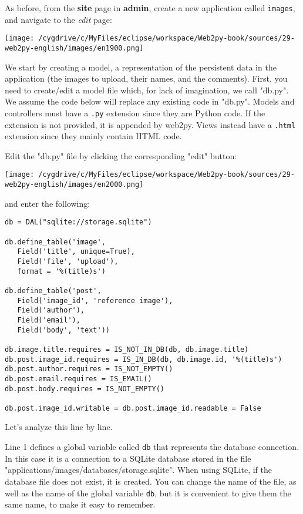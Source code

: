 \documentclass[justified,sixbynine,notoc]{tufte-book}
\def\ft{\small\tt}
\def\inxx#1{\index{#1}}
\begin{document}
\begin{fullwidth}
As before, from the {\bf site} page in {\bf admin}, create a new application called {\ft images}, and navigate to the {\it edit} page:


\goodbreak\begin{center}\texttt{[image: /cygdrive/c/MyFiles/eclipse/workspace/Web2py-book/sources/29-web2py-english/images/en1900.png]}\end{center}


We start by creating a model, a representation of the persistent data in the application (the images to upload, their names, and the comments). First, you need to create/edit a model file which, for lack of imagination, we call "db.py". We assume the code below will replace any existing code in "db.py". Models and controllers must have a {\ft .py} extension since they are Python code. If the extension is not provided, it is appended by web2py. Views instead have a {\ft .html} extension since they mainly contain HTML code.

Edit the "db.py" file by clicking the corresponding "edit" button:


\goodbreak\begin{center}\texttt{[image: /cygdrive/c/MyFiles/eclipse/workspace/Web2py-book/sources/29-web2py-english/images/en2000.png]}\end{center}

\noindent and enter the following:

\inxx{IS\_EMAIL} \inxx{IS\_NOT\_EMPTY} \inxx{IS\_IN\_DB}
\begin{lstlisting}
db = DAL("sqlite://storage.sqlite")

db.define_table('image',
   Field('title', unique=True),
   Field('file', 'upload'),
   format = '%(title)s')

db.define_table('post',
   Field('image_id', 'reference image'),
   Field('author'),
   Field('email'),
   Field('body', 'text'))

db.image.title.requires = IS_NOT_IN_DB(db, db.image.title)
db.post.image_id.requires = IS_IN_DB(db, db.image.id, '%(title)s')
db.post.author.requires = IS_NOT_EMPTY()
db.post.email.requires = IS_EMAIL()
db.post.body.requires = IS_NOT_EMPTY()

db.post.image_id.writable = db.post.image_id.readable = False
\end{lstlisting}

Let's analyze this line by line.

Line 1 defines a global variable called {\ft db} that represents the database connection. In this case it is a connection to a SQLite database stored in the file  "applications/images/databases/storage.sqlite". When using SQLite, if the database file does not exist, it is created. You can change the name of the file, as well as the name of the global variable {\ft db}, but it is convenient to give them the same name, to make it easy to remember.


\end{fullwidth}
\end{document}
